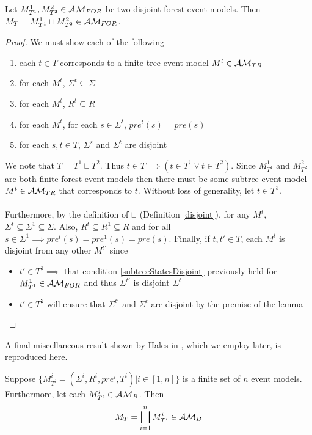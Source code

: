 \begin{lemma} \label{disjForestIsForest}
Let $M^1_{T^1}, M^2_{T^2} \in \mathcal{AM}_{FOR}$ be two disjoint forest event models.
Then $M_T = M^1_{T^1} \sqcup M^2_{T^2} \in \mathcal{AM}_{FOR}$.
\end{lemma}

\begin{proof}
We must show each of the following
\begin{enumerate}
	\item each $t \in T$ corresponds to a finite tree event model $M^t \in \mathcal{AM}_{TR}$ \label{treeCorrespondence}
	\item for each $M^t$, $\Sigma^t \subseteq \Sigma$ \label{forestStateSubsets}
	\item for each $M^t$, $R^t \subseteq R$ \label{forestEdgeSubsets}
	\item for each $M^t$, for each $s \in \Sigma^t$, $pre^t(s) = pre(s)$ \label{preconMatch}
	\item for each $s, t \in T$, $\Sigma^s$ and $\Sigma^t$ are disjoint \label{subtreeStatesDisjoint}
\end{enumerate}

We note that $T = T^1 \sqcup T^2$.
Thus $t \in T \implies (t \in T^1 \lor t \in T^2)$.
Since $M^1_{T^1}$ and $M^2_{T^2}$ are both finite forest event models then there must be some
subtree event model $M^t \in \mathcal{AM}_{TR}$ that corresponds to $t$.
Without loss of generality, let $t \in T^1$.\\
\\
Furthermore, by the definition of $\sqcup$ (Definition \ref{disjoint}), for any $M^t$, $\Sigma^t \subseteq \Sigma^1 \subseteq \Sigma$.
Also, $R^t \subseteq R^1 \subseteq R$ and for all $s \in \Sigma^1 \implies pre^t(s) = pre^1(s) =
pre(s)$.
Finally, if $t, t' \in T$, each $M^t$ is disjoint from any other $M^{t'}$ since
\begin{itemize}
	\item $t' \in T^1 \implies$ that condition \ref{subtreeStatesDisjoint} previously held for
	$M^1_{T^1} \in \mathcal{AM}_{FOR}$ and thus $\Sigma^{t'}$ is disjoint $\Sigma^t$
	\item $t' \in T^2$ will ensure that $\Sigma^{t'}$ and $\Sigma^t$ are disjoint by the premise of
	the lemma
\end{itemize}
\end{proof}

A final miscellaneous result shown by Hales in \FIXME, which we employ later, is reproduced here.

\begin{lemma} \label{brestrictDisjoint}
Suppose $\{ M^i_{T^i} = (\Sigma^i, R^i, pre^i, T^i) | i \in [1, n] \}$ is a finite set of $n$ event
models.
Furthermore, let each $M^i_{T^i} \in \mathcal{AM}_B$.
Then
\[
	M_T = \bigsqcup_{i = 1}^{n} M^i_{T^i} \in \mathcal{AM}_B
\]
\end{lemma}


